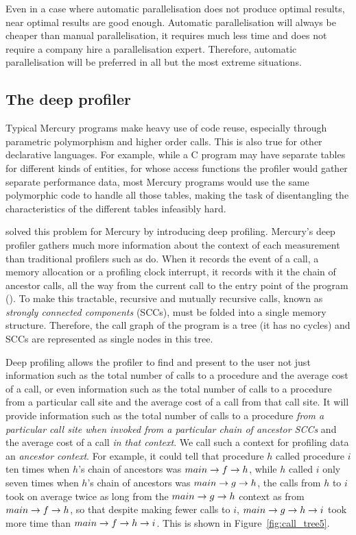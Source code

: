 Even in a case where automatic parallelisation does not produce optimal
results,
near optimal results are good enough.
Automatic parallelisation will always be cheaper than manual
parallelisation,
it requires much less time and does not require a company hire a
parallelisation expert.
Therefore, automatic parallelisation will be preferred in all but the most
extreme situations.

\subsection{The deep profiler}
\label{sec:backgnd_deep}

Typical Mercury programs make heavy use of code reuse,
especially through parametric polymorphism and higher order calls.
This is also true for other declarative languages.
For example, while a C program may have
separate tables for different kinds of entities,
for whose access functions
the profiler would gather separate performance data,
most Mercury programs would use
the same polymorphic code to handle all those tables,
making the task of disentangling the characteristics of the different tables
infeasibly hard.

\citep{conway:2001:mercury-deep}
solved this problem for Mercury by introducing deep profiling.
Mercury's deep profiler gathers much more information about the context of
each measurement than traditional profilers such as  \citep{gprof} do.
When it records the event of a call,
a memory allocation or a profiling clock interrupt,
it records with it the chain of ancestor calls,
all the way from the current call to the entry point of the program
().
To make this tractable,
recursive and mutually recursive calls,
known as \emph{strongly connected components} (SCCs),
must be folded into a single memory structure.
Therefore, the call graph of the program is a tree (it has no cycles)
and SCCs are represented as single nodes in this tree.

Deep profiling allows the profiler to find and present to the user
not just information such as the total number of calls to a procedure
and the average cost of a call,
or even information such as the total number of calls to a procedure
from a particular call site and the average cost of a call from that call
site.
It will provide information such as the total number of calls to a procedure
\emph{from a particular call site
when invoked from a particular chain of ancestor SCCs}
and the average cost of a call \emph{in that context}.
We call such a context for profiling data an \emph{ancestor context}.
For example, it could tell that
procedure $h$ called procedure $i$ ten times
when $h$'s chain of ancestors was $main \rightarrow f \rightarrow h$,
while $h$ called $i$ only seven times
when $h$'s chain of ancestors was $main \rightarrow g \rightarrow h$,
the calls from $h$ to $i$ took on average twice as long
from the $main \rightarrow g \rightarrow h$ context as from $main \rightarrow f \rightarrow h$,
so that despite making fewer calls to $i$,
$main \rightarrow g \rightarrow h \rightarrow i$ took more time than $main \rightarrow f \rightarrow h \rightarrow i$.
This is shown in Figure~\ref{fig:call_tree5}.


